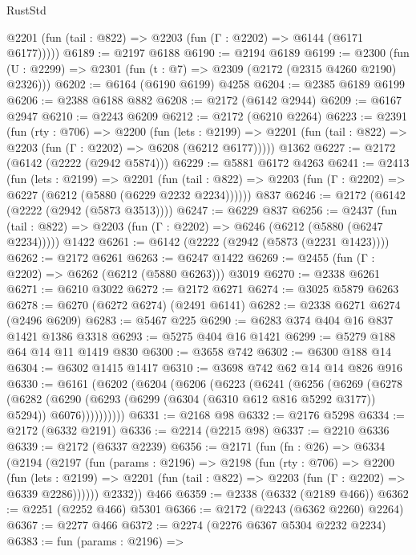 \begin{lexlean}{RustStd}
\begin{coremodule}
      @2201 (fun (tail : @822) => @2203 (fun (Γ : @2202) => @6144 (@6171 @6177)))))
@6189 := @2197 @6188
@6190 := @2194 @6189
@6199 := @2300 (fun (U : @2299) => @2301 (fun (t : @7) => @2309 (@2172 (@2315 @4260 @2190) @2326)))
@6202 := @6164 (@6190 @6199) @4258
@6204 := @2385 @6189 @6199
@6206 := @2388 @6188 @882
@6208 := @2172 (@6142 @2944)
@6209 := @6167 @2947
@6210 := @2243 @6209
@6212 := @2172 (@6210 @2264)
@6223 := @2391
    (fun (rty : @706) =>
    @2200
      (fun (lets : @2199) =>
      @2201 (fun (tail : @822) => @2203 (fun (Γ : @2202) => @6208 (@6212 @6177)))))
    @1362
@6227 := @2172 (@6142 (@2222 (@2942 @5874)))
@6229 := @5881 @6172 @4263
@6241 := @2413
    (fun (lets : @2199) =>
    @2201
      (fun (tail : @822) => @2203 (fun (Γ : @2202) => @6227 (@6212 (@5880 (@6229 @2232 @2234))))))
    @837
@6246 := @2172 (@6142 (@2222 (@2942 (@5873 @3513))))
@6247 := @6229 @837
@6256 := @2437
    (fun (tail : @822) => @2203 (fun (Γ : @2202) => @6246 (@6212 (@5880 (@6247 @2234)))))
    @1422
@6261 := @6142 (@2222 (@2942 (@5873 (@2231 @1423))))
@6262 := @2172 @6261
@6263 := @6247 @1422
@6269 := @2455 (fun (Γ : @2202) => @6262 (@6212 (@5880 @6263))) @3019
@6270 := @2338 @6261
@6271 := @6210 @3022
@6272 := @2172 @6271
@6274 := @3025 @5879 @6263
@6278 := @6270 (@6272 @6274) (@2491 @6141)
@6282 := @2338 @6271 @6274 (@2496 @6209)
@6283 := @5467 @225
@6290 := @6283 @374 @404 @16 @837 @1421 @1386 @3318
@6293 := @5275 @404 @16 @1421
@6299 := @5279 @188 @64 @14 @11 @1419 @830
@6300 := @3658 @742
@6302 := @6300 @188 @14
@6304 := @6302 @1415 @1417
@6310 := @3698 @742 @62 @14 @14 @826 @916
@6330 := @6161
    (@6202
      (@6204
        (@6206
          (@6223
            (@6241
              (@6256
                (@6269
                  (@6278
                    (@6282
                      (@6290
                        (@6293 (@6299 (@6304 (@6310 @612 @816 @5292 @3177)) @5294))
                        @6076))))))))))
@6331 := @2168 @98
@6332 := @2176 @5298
@6334 := @2172 (@6332 @2191)
@6336 := @2214 (@2215 @98)
@6337 := @2210 @6336
@6339 := @2172 (@6337 @2239)
@6356 := @2171
    (fun (fn : @26) =>
    @6334
      (@2194
        (@2197
          (fun (params : @2196) =>
          @2198
            (fun (rty : @706) =>
            @2200
              (fun (lets : @2199) =>
              @2201 (fun (tail : @822) => @2203 (fun (Γ : @2202) => @6339 @2286))))))
        @2332))
    @466
@6359 := @2338 (@6332 (@2189 @466))
@6362 := @2251 (@2252 @466) @5301
@6366 := @2172 (@2243 (@6362 @2260) @2264)
@6367 := @2277 @466
@6372 := @2274 (@2276 @6367 @5304 @2232 @2234)
@6383 := fun (params : @2196) =>

\end{coremodule}
\end{lexlean}
